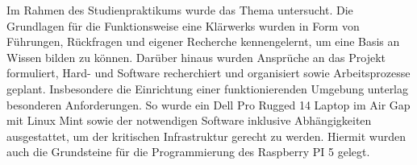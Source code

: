 Im Rahmen des Studienpraktikums wurde das Thema untersucht. Die Grundlagen für die Funktionsweise eine Klärwerks wurden in Form von Führungen, Rückfragen und eigener Recherche kennengelernt, um eine Basis an Wissen bilden zu können. Darüber hinaus wurden Ansprüche an das Projekt formuliert, Hard- und Software recherchiert und organisiert sowie Arbeitsprozesse geplant. Insbesondere die Einrichtung einer funktionierenden Umgebung unterlag besonderen Anforderungen. So wurde ein Dell Pro Rugged 14 Laptop im Air Gap mit Linux Mint sowie der notwendigen Software inklusive Abhängigkeiten ausgestattet, um der kritischen Infrastruktur gerecht zu werden. Hiermit wurden auch die Grundsteine für die Programmierung des Raspberry PI 5 gelegt. 











  


